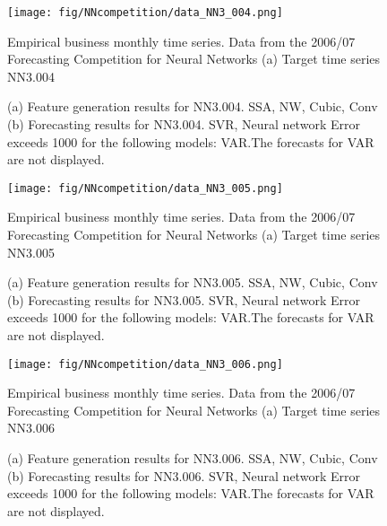 \documentclass[12pt]{article}
\begin{document}
\begin{figure}
\centering
\texttt{[image: fig/NNcompetition/data\_NN3\_004.png]}
\caption{Empirical business monthly time series. Data from the 2006/07 Forecasting Competition for Neural Networks	(a) Target time series	NN3.004	}
\end{figure}


\begin{figure}
\centering
{}
\caption{(a)	Feature generation results for	NN3.004.	SSA, NW, Cubic, Conv	(b)	Forecasting results for	NN3.004.	SVR, Neural network	Error exceeds 1000 for the following models: VAR.The forecasts for VAR are not displayed.	}
\end{figure}


\begin{figure}
\centering
\texttt{[image: fig/NNcompetition/data\_NN3\_005.png]}
\caption{Empirical business monthly time series. Data from the 2006/07 Forecasting Competition for Neural Networks	(a) Target time series	NN3.005	}
\end{figure}


\begin{figure}
\centering
{}
\caption{(a)	Feature generation results for	NN3.005.	SSA, NW, Cubic, Conv	(b)	Forecasting results for	NN3.005.	SVR, Neural network	Error exceeds 1000 for the following models: VAR.The forecasts for VAR are not displayed.	}
\end{figure}


\begin{figure}
\centering
\texttt{[image: fig/NNcompetition/data\_NN3\_006.png]}
\caption{Empirical business monthly time series. Data from the 2006/07 Forecasting Competition for Neural Networks	(a) Target time series	NN3.006	}
\end{figure}


\begin{figure}
\centering
{}
\caption{(a)	Feature generation results for	NN3.006.	SSA, NW, Cubic, Conv	(b)	Forecasting results for	NN3.006.	SVR, Neural network	Error exceeds 1000 for the following models: VAR.The forecasts for VAR are not displayed.	}
\end{figure}
\end{document}

